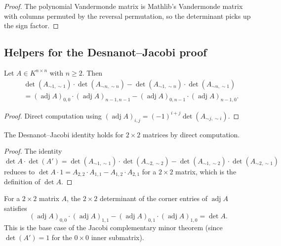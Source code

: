 \begin{proof}
The polynomial Vandermonde matrix is Mathlib's Vandermonde matrix with columns
permuted by the reversal permutation, so the determinant picks up the sign factor.
\end{proof}

\subsection{Helpers for the Desnanot--Jacobi proof}

\begin{lemma}
\label{lem.det.adj-corners}
\leanhelper
\leanok
Let $A \in K^{n \times n}$ with $n \geq 2$. Then
\begin{align*}
  & \det(A_{\sim 1, \sim 1}) \cdot \det(A_{\sim n, \sim n})
    - \det(A_{\sim 1, \sim n}) \cdot \det(A_{\sim n, \sim 1}) \\
  &= (\operatorname{adj} A)_{0,0} \cdot (\operatorname{adj} A)_{n-1,n-1}
     - (\operatorname{adj} A)_{0,n-1} \cdot (\operatorname{adj} A)_{n-1,0}.
\end{align*}
\end{lemma}

\begin{proof}
Direct computation using $(\operatorname{adj} A)_{i,j} = (-1)^{i+j} \det(A_{\sim j, \sim i})$.
\end{proof}

\begin{lemma}
\label{lem.det.desnanot-jacobi-base}
\leanhelper
\leanok
The Desnanot--Jacobi identity holds for $2 \times 2$ matrices by direct
computation.
\end{lemma}

\begin{proof}
\leanok
The identity $\det A \cdot \det(A') = \det(A_{\sim 1,\sim 1}) \cdot \det(A_{\sim 2,\sim 2}) - \det(A_{\sim 1,\sim 2}) \cdot \det(A_{\sim 2,\sim 1})$
reduces to $\det A \cdot 1 = A_{2,2} \cdot A_{1,1} - A_{1,2} \cdot A_{2,1}$
for a $2 \times 2$ matrix, which is the definition of $\det A$.
\end{proof}

\begin{lemma}
\label{lem.det.jacobi-complement-2x2-base}
\leanhelper
\leanok
For a $2 \times 2$ matrix $A$, the $2 \times 2$ determinant of the corner
entries of $\operatorname{adj} A$ satisfies
\[
  (\operatorname{adj} A)_{0,0} \cdot (\operatorname{adj} A)_{1,1}
  - (\operatorname{adj} A)_{0,1} \cdot (\operatorname{adj} A)_{1,0}
  = \det A.
\]
This is the base case of the Jacobi complementary minor theorem
(since $\det(A') = 1$ for the $0 \times 0$ inner submatrix).
\end{lemma}

